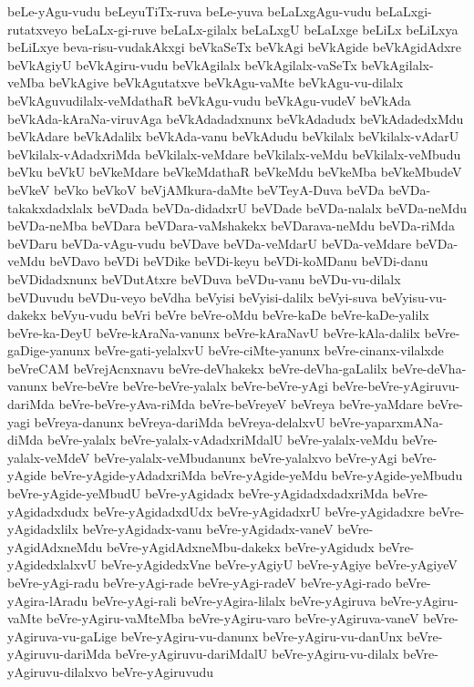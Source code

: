 {beLe-yAgu-vudu
beLeyuTiTx-ruva
beLe-yuva
beLaLxgAgu-vudu
beLaLxgi-rutatxveyo
beLaLx-gi-ruve
beLaLx-gilalx
beLaLxgU
beLaLxge
beLiLx
beLiLxya
beLiLxye
beva-risu-vudakAkxgi
beVkaSeTx
beVkAgi
beVkAgide
beVkAgidAdxre
beVkAgiyU
beVkAgiru-vudu
beVkAgilalx
beVkAgilalx-vaSeTx
beVkAgilalx-veMba
beVkAgive
beVkAgutatxve
beVkAgu-vaMte
beVkAgu-vu-dilalx
beVkAguvudilalx-veMdathaR
beVkAgu-vudu
beVkAgu-vudeV
beVkAda
beVkAda-kAraNa-viruvAga
beVkAdadadxnunx
beVkAdadudx
beVkAdadedxMdu
beVkAdare
beVkAdalilx
beVkAda-vanu
beVkAdudu
beVkilalx
beVkilalx-vAdarU
beVkilalx-vAdadxriMda
beVkilalx-veMdare
beVkilalx-veMdu
beVkilalx-veMbudu
beVku
beVkU
beVkeMdare
beVkeMdathaR
beVkeMdu
beVkeMba
beVkeMbudeV
beVkeV
beVko
beVkoV
beVjAMkura-daMte
beVTeyA-Duva
beVDa
beVDa-takakxdadxlalx
beVDada
beVDa-didadxrU
beVDade
beVDa-nalalx
beVDa-neMdu
beVDa-neMba
beVDara
beVDara-vaMshakekx
beVDarava-neMdu
beVDa-riMda
beVDaru
beVDa-vAgu-vudu
beVDave
beVDa-veMdarU
beVDa-veMdare
beVDa-veMdu
beVDavo
beVDi
beVDike
beVDi-keyu
beVDi-koMDanu
beVDi-danu
beVDidadxnunx
beVDutAtxre
beVDuva
beVDu-vanu
beVDu-vu-dilalx
beVDuvudu
beVDu-veyo
beVdha
beVyisi
beVyisi-dalilx
beVyi-suva
beVyisu-vu-dakekx
beVyu-vudu
beVri
beVre
beVre-oMdu
beVre-kaDe
beVre-kaDe-yalilx
beVre-ka-DeyU
beVre-kAraNa-vanunx
beVre-kAraNavU
beVre-kAla-dalilx
beVre-gaDige-yanunx
beVre-gati-yelalxvU
beVre-ciMte-yanunx
beVre-cinanx-vilalxde
beVreCAM
beVrejAcnxnavu
beVre-deVhakekx
beVre-deVha-gaLalilx
beVre-deVha-vanunx
beVre-beVre
beVre-beVre-yalalx
beVre-beVre-yAgi
beVre-beVre-yAgiruvu-dariMda
beVre-beVre-yAva-riMda
beVre-beVreyeV
beVreya
beVre-yaMdare
beVre-yagi
beVreya-danunx
beVreya-dariMda
beVreya-delalxvU
beVre-yaparxmANa-diMda
beVre-yalalx
beVre-yalalx-vAdadxriMdalU
beVre-yalalx-veMdu
beVre-yalalx-veMdeV
beVre-yalalx-veMbudanunx
beVre-yalalxvo
beVre-yAgi
beVre-yAgide
beVre-yAgide-yAdadxriMda
beVre-yAgide-yeMdu
beVre-yAgide-yeMbudu
beVre-yAgide-yeMbudU
beVre-yAgidadx
beVre-yAgidadxdadxriMda
beVre-yAgidadxdudx
beVre-yAgidadxdUdx
beVre-yAgidadxrU
beVre-yAgidadxre
beVre-yAgidadxlilx
beVre-yAgidadx-vanu
beVre-yAgidadx-vaneV
beVre-yAgidAdxneMdu
beVre-yAgidAdxneMbu-dakekx
beVre-yAgidudx
beVre-yAgidedxlalxvU
beVre-yAgidedxVne
beVre-yAgiyU
beVre-yAgiye
beVre-yAgiyeV
beVre-yAgi-radu
beVre-yAgi-rade
beVre-yAgi-radeV
beVre-yAgi-rado
beVre-yAgira-lAradu
beVre-yAgi-rali
beVre-yAgira-lilalx
beVre-yAgiruva
beVre-yAgiru-vaMte
beVre-yAgiru-vaMteMba
beVre-yAgiru-varo
beVre-yAgiruva-vaneV
beVre-yAgiruva-vu-gaLige
beVre-yAgiru-vu-danunx
beVre-yAgiru-vu-danUnx
beVre-yAgiruvu-dariMda
beVre-yAgiruvu-dariMdalU
beVre-yAgiru-vu-dilalx
beVre-yAgiruvu-dilalxvo
beVre-yAgiruvudu
}
